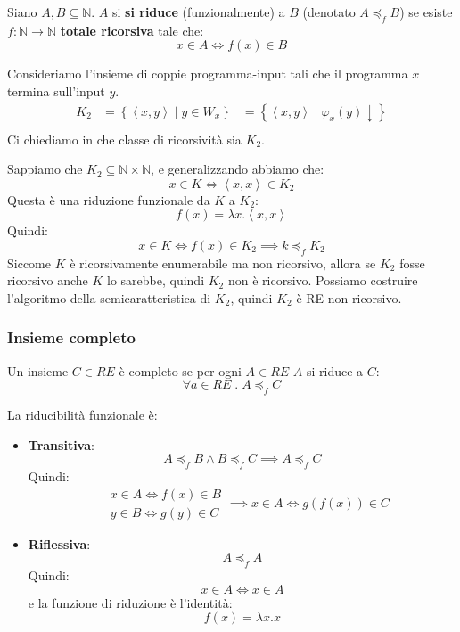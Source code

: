 \documentclass[a4paper]{article}
\begin{document}
\begin{definition}
  Siano \( A, B \subseteq \mathbb{N} \). \( A \) si \textbf{si riduce} (funzionalmente)
  a \( B \) (denotato \( A \preceq_f B \)) se esiste \( f: \mathbb{N} \to \mathbb{N} \) 
  \textbf{totale ricorsiva} tale che:
  \[
    x \in A \iff f(x) \in B
  \] 
\end{definition}

\begin{example}
  Consideriamo l'insieme di
  coppie programma-input tali che il programma \( x \) termina sull'input \( y \).
  \[
    \begin{aligned}
      K_2 &= \left\{ \left. \left<x, y \right> \;\right|\; y \in W_x \right\}
          &= \left\{ \left. \left<x, y \right> \;\right|\; \varphi_x(y) \downarrow \right\}\\
    \end{aligned}
  \] 
  Ci chiediamo in che classe di ricorsività sia \( K_2 \).

  \vspace{1em}
  \noindent
  Sappiamo che \( K_2 \subseteq \mathbb{N} \times \mathbb{N} \), e generalizzando
  abbiamo che:
  \[
    x \in K \iff \left<x, x \right> \in K_2
  \] 
  Questa è una riduzione funzionale da \( K \) a \( K_2 \):
  \[
    f(x) = \lambda x. \left<x, x \right>
  \] 
  Quindi:
  \[
     x \in K \iff f(x) \in K_2 \implies k \preceq_f K_2
  \] 
  Siccome \( K \) è ricorsivamente enumerabile ma non ricorsivo, allora
  se \( K_2 \) fosse ricorsivo anche \( K \) lo sarebbe, quindi \( K_2 \)
  non è ricorsivo.
  Possiamo costruire l'algoritmo della semicaratteristica di \( K_2 \), quindi
  \( K_2 \) è RE non ricorsivo.
\end{example}

\subsubsection{Insieme completo}
\begin{definition}
  Un insieme \( C \in RE \) è completo se per ogni \( A \in RE \) \( A \) si riduce
  a \( C \):
  \[
    \forall a \in RE \;.\; A \preceq_f C
  \] 

  \vspace{1em}
  \noindent
  La riducibilità funzionale è:
  \begin{itemize}
    \item \textbf{Transitiva}:
      \[
        A \preceq_f B \wedge B \preceq_f C \implies A \preceq_f C
      \] 
      Quindi:
      \[
        \begin{aligned}
          &x \in A \iff f(x) \in B\\
          &y \in B \iff g(y) \in C
        \end{aligned}
        \implies x \in A \iff g(f(x)) \in C
      \] 

    \item \textbf{Riflessiva}:
      \[
        A \preceq_f A
      \]
      Quindi:
      \[
        x \in A \iff x \in A
      \] 
      e la funzione di riduzione è l'identità:
      \[
        f(x) = \lambda x. x
      \] 
  \end{itemize}
\end{definition}
\end{document}
